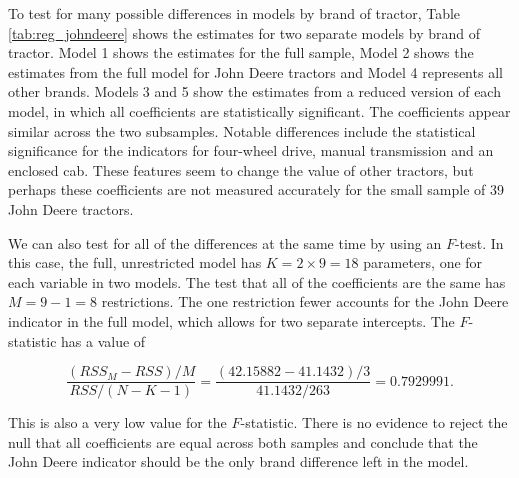 To test for many possible differences in 
models by brand of tractor, 
Table \ref{tab:reg_johndeere}
shows the estimates for two separate models
by brand of tractor.
%
Model 1 shows the estimates for 
the full sample,
Model 2 shows the estimates from the full model for 
John Deere tractors
and Model 4 
represents all other brands. 
% 
Models 3 and 5 show the estimates from a reduced version of each model, 
in which all coefficients are statistically significant. 
% 
The coefficients appear similar across the two subsamples.
Notable differences include the statistical significance for 
the indicators for four-wheel drive, 
manual transmission and an enclosed cab. 
These features seem to change the value of 
other tractors, but perhaps these coefficients are not measured 
accurately for the small sample of 39 
John Deere tractors. 



We can also test for all of the differences at the same time
by using an $F$-test. 
In this case, the full, unrestricted model has $K = 2\times9 = 18$ parameters, one for each variable in two models. 
The test that all of the coefficients are the same has $M = 9 - 1 = 8$
restrictions. 
The one restriction fewer accounts for the John Deere indicator
in the full model, 
which allows for two separate intercepts. 
% 
The $F$-statistic has a value of 

$$ 
\frac{(RSS_M - RSS)/M}{RSS/(N - K - 1)} = \frac{(42.15882 - 41.1432)/3}{41.1432/263} = 0.7929991. 
$$

This is also a very low value for the $F$-statistic. 
There is no evidence to reject the null that all 
coefficients are equal across both samples 
and conclude that the John Deere indicator
should be the only brand difference left in the model. 

% 
